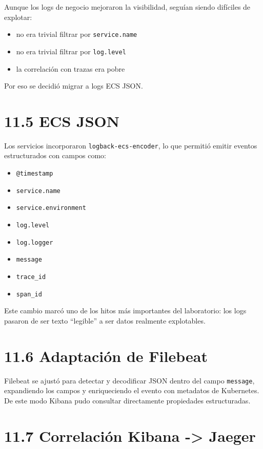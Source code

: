 \documentclass[
a4paper,
12pt]{report}
\providecommand{\tightlist}{%
  \setlength{\itemsep}{0pt}\setlength{\parskip}{0pt}}
\begin{document}
Aunque los logs de negocio mejoraron la visibilidad, seguían siendo
difíciles de explotar:

\begin{itemize}
\tightlist
\item
  no era trivial filtrar por \texttt{service.name}
\item
  no era trivial filtrar por \texttt{log.level}
\item
  la correlación con trazas era pobre
\end{itemize}

Por eso se decidió migrar a logs ECS JSON.

\section{11.5 ECS JSON}\label{ecs-json}

Los servicios incorporaron \texttt{logback-ecs-encoder}, lo que permitió
emitir eventos estructurados con campos como:

\begin{itemize}
\tightlist
\item
  \texttt{@timestamp}
\item
  \texttt{service.name}
\item
  \texttt{service.environment}
\item
  \texttt{log.level}
\item
  \texttt{log.logger}
\item
  \texttt{message}
\item
  \texttt{trace\_id}
\item
  \texttt{span\_id}
\end{itemize}

Este cambio marcó uno de los hitos más importantes del laboratorio: los
logs pasaron de ser texto ``legible'' a ser datos realmente explotables.

\section{11.6 Adaptación de Filebeat}\label{adaptaciuxf3n-de-filebeat}

Filebeat se ajustó para detectar y decodificar JSON dentro del campo
\texttt{message}, expandiendo los campos y enriqueciendo el evento con
metadatos de Kubernetes. De este modo Kibana pudo consultar directamente
propiedades estructuradas.

\section{11.7 Correlación Kibana -\textgreater{}
Jaeger}\label{correlaciuxf3n-kibana---jaeger}
\end{document}

